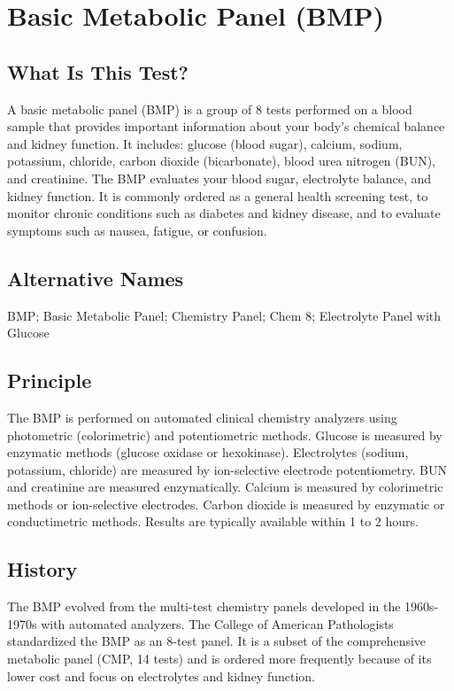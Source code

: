\chapter{Basic Metabolic Panel (BMP)}

\section*{What Is This Test?}
A basic metabolic panel (BMP) is a group of 8 tests performed on a blood sample that provides important information about your body's chemical balance and kidney function. It includes: glucose (blood sugar), calcium, sodium, potassium, chloride, carbon dioxide (bicarbonate), blood urea nitrogen (BUN), and creatinine. The BMP evaluates your blood sugar, electrolyte balance, and kidney function. It is commonly ordered as a general health screening test, to monitor chronic conditions such as diabetes and kidney disease, and to evaluate symptoms such as nausea, fatigue, or confusion.

\section*{Alternative Names}
BMP; Basic Metabolic Panel; Chemistry Panel; Chem 8; Electrolyte Panel with Glucose

\section*{Principle}
The BMP is performed on automated clinical chemistry analyzers using photometric (colorimetric) and potentiometric methods. Glucose is measured by enzymatic methods (glucose oxidase or hexokinase). Electrolytes (sodium, potassium, chloride) are measured by ion-selective electrode potentiometry. BUN and creatinine are measured enzymatically. Calcium is measured by colorimetric methods or ion-selective electrodes. Carbon dioxide is measured by enzymatic or conductimetric methods. Results are typically available within 1 to 2 hours.

\section*{History}
The BMP evolved from the multi-test chemistry panels developed in the 1960s-1970s with automated analyzers. The College of American Pathologists standardized the BMP as an 8-test panel. It is a subset of the comprehensive metabolic panel (CMP, 14 tests) and is ordered more frequently because of its lower cost and focus on electrolytes and kidney function.

